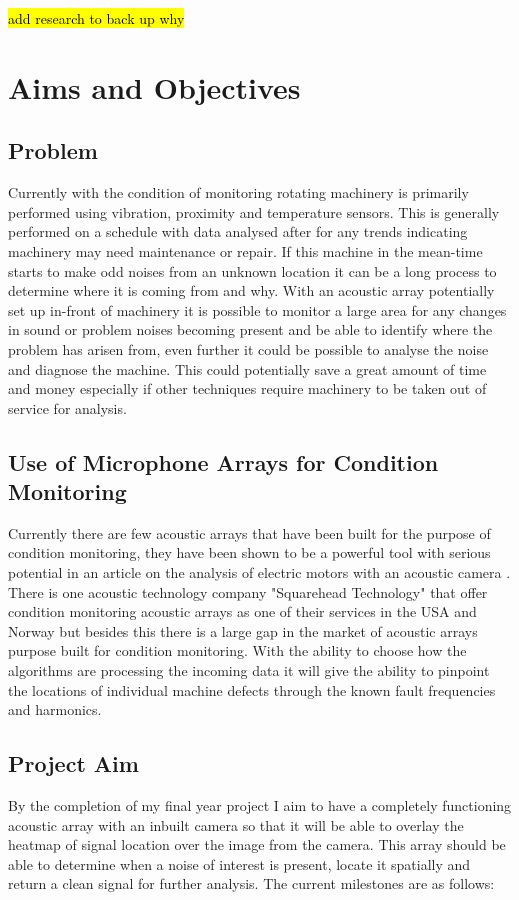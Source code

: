 \documentclass{UoNMCHA}
\numberwithin{equation}{section}
\begin{document}
    \hl{add research to back up why}
    
\newpage
\section{Aims and Objectives} \label{sec:Aims and Objectives}
\subsection{Problem} \label{sec:Problem}
    Currently with the condition of monitoring rotating machinery is primarily performed using vibration, proximity and temperature sensors. This is generally performed on a schedule with data analysed after for any trends indicating machinery may need maintenance or repair. If this machine in the mean-time starts to make odd noises from an unknown location it can be a long process to determine where it is coming from and why. With an acoustic array potentially set up in-front of machinery it is possible to monitor a large area for any changes in sound or problem noises becoming present and be able to identify where the problem has arisen from, even further it could be possible to analyse the noise and diagnose the machine. This could potentially save a great amount of time and money especially if other techniques require machinery to be taken out of service for analysis.
\subsection{Use of Microphone Arrays for Condition Monitoring} \label{sec:use for CM}
    Currently there are few acoustic arrays that have been built for the purpose of condition monitoring, they have been shown to be a powerful tool with serious potential in an article on the analysis of electric motors with an acoustic camera \citep{Orm13}. There is one acoustic technology company "Squarehead Technology" that offer condition monitoring acoustic arrays as one of their services in the USA and Norway but besides this there is a large gap in the market of acoustic arrays purpose built for condition monitoring. With the ability to choose how the algorithms are processing the incoming data it will give the ability to pinpoint the locations of individual machine defects through the known fault frequencies and harmonics.
\subsection{Project Aim} \label{sec:Project  Aim}
    By the completion of my final year project I aim to have a completely functioning acoustic array with an inbuilt camera so that it will be able to overlay the heatmap of signal location over the image from the camera. This array should be able to determine when a noise of interest is present, locate it spatially and return a clean signal for further analysis. The current milestones are as follows:
    
\end{document}
